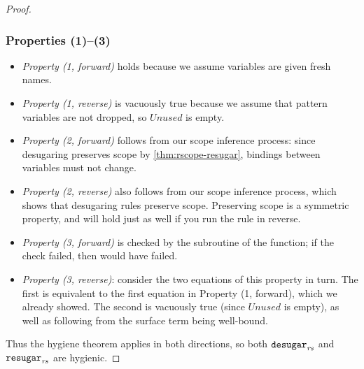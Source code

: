 \begin{proof}
  \subsubsection{Properties (1)--(3)}
  \begin{itemize}[noitemsep]
  \item[] \emph{Property (1, forward)} holds because we assume
    variables are given fresh names.
  \item[] \emph{Property (1, reverse)} is vacuously true because we
    assume that pattern variables are not dropped, so
    $\mathit{Unused}$ is empty.
  \item[] \emph{Property (2, forward)} follows from our scope
    inference process: since desugaring preserves scope by
    \cref{thm:rscope-resugar}, bindings between variables must not
    change.
  \item[] \emph{Property (2, reverse)} also follows from our scope
    inference process, which shows that desugaring rules preserve
    scope. Preserving scope is a symmetric property, and will hold
    just as well if you run the rule in reverse.
  \item[] \emph{Property (3, forward)} is checked by the
     subroutine of the  function; if the
    check failed, then  would have failed.
  \item[] \emph{Property (3, reverse)}: consider the two equations of
    this property in turn. The first is equivalent to the first
    equation in Property (1, forward), which we already showed. The
    second is vacuously true (since $\mathit{Unused}$ is empty), as
    well as following from the surface term being well-bound.
  \end{itemize}
  Thus the hygiene theorem applies in both directions, so both
  $\texttt{desugar}_{\mathit{rs}}$ and $\texttt{resugar}_{\mathit{rs}}$ are hygienic.
\end{proof}





